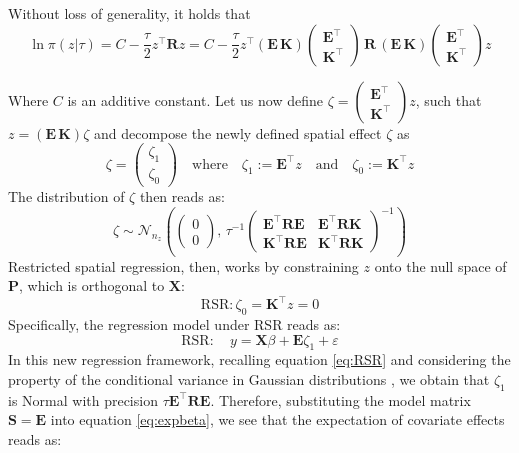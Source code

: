 \documentclass[openany, 11pt, oneside]{book}
\begin{document}
Without loss of generality, it holds that
$$
\ln \pi(z \vert \tau) = C -\dfrac{\tau}{2} z^{\top} \boldsymbol{R} z  = 
C -\dfrac{\tau}{2} z^{\top} \left(\boldsymbol{E \, K}\right)
\begin{pmatrix} \boldsymbol{E}^{\top} \\ \boldsymbol{K}^{\top}\end{pmatrix} 
\, \boldsymbol{R} \, \left(\boldsymbol{E \, K}\right) 
\begin{pmatrix} \boldsymbol{E}^{\top} \\ \boldsymbol{K}^{\top}\end{pmatrix}  z 
$$

Where $C$ is an additive constant. Let us now define $\zeta = \begin{pmatrix} \boldsymbol{E}^{\top} \\ \boldsymbol{K}^{\top} \end{pmatrix} z$, such that $z = \left(\boldsymbol{E \, K}\right) \zeta$ and decompose the newly defined spatial effect $\zeta$ as
$$
\zeta = \begin{pmatrix} \zeta_1 \\ \zeta_0 \end{pmatrix} \quad \text{where} \quad  \zeta_1 := \boldsymbol{E}^{\top}z \quad \text{and} \quad \zeta_0 := \boldsymbol{K}^{\top}z
$$ 
The distribution of $\zeta$ then reads as:
$$
\zeta \sim \mathcal{N}_{n_z} \left(\begin{pmatrix} 0 \\ 0 \end{pmatrix}, \, \tau^{-1} 
\begin{pmatrix} \boldsymbol{E}^{\top}\boldsymbol{R E} & \boldsymbol{E}^{\top}\boldsymbol{R K} \\
\boldsymbol{K}^{\top}\boldsymbol{R E} & \boldsymbol{K}^{\top}\boldsymbol{R K} \end{pmatrix}^{-1} \right)
$$
%
 Restricted spatial regression, then, works by constraining $z$ onto the null space of $\boldsymbol{P}$, which is orthogonal to $\boldsymbol{X}$: 
$$
\mathrm{RSR}: \zeta_0 = \boldsymbol{K}^{\top}z = 0
$$
Specifically, the regression model under RSR reads as:
%
\begin{equation} \label{eq:RSR}
\mathrm{RSR}: \quad y%
= \boldsymbol{X} \beta + \boldsymbol{E} \zeta_1 + \varepsilon
\end{equation}
%
In this new regression framework, recalling equation \ref{eq:RSR} and  considering the property of the conditional variance in Gaussian distributions \parencite[Result 4.6 of][see also section \ref{section:GMRFs}]{JohnsonWichern}, we obtain that $\zeta_1$ is Normal with precision $\tau \boldsymbol{E^\top R E}$. Therefore, substituting the model matrix $\boldsymbol{S} = \boldsymbol{E}$ into equation \ref{eq:expbeta}, we see that the expectation of covariate effects reads as:
\end{document}
